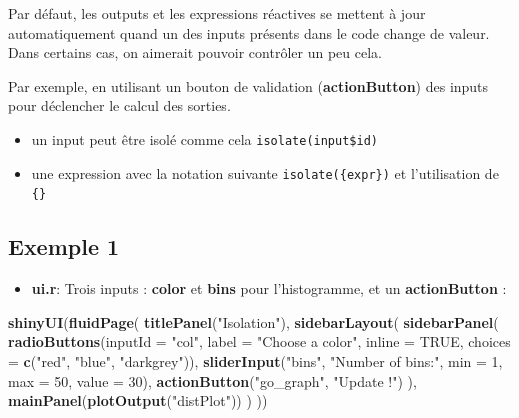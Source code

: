 \documentclass[]{article}
\newenvironment{Shaded}{\begin{snugshade}}{\end{snugshade}}
\newcommand{\KeywordTok}[1]{\textcolor[rgb]{0.13,0.29,0.53}{\textbf{#1}}}
\newcommand{\DataTypeTok}[1]{\textcolor[rgb]{0.13,0.29,0.53}{#1}}
\newcommand{\DecValTok}[1]{\textcolor[rgb]{0.00,0.00,0.81}{#1}}
\newcommand{\StringTok}[1]{\textcolor[rgb]{0.31,0.60,0.02}{#1}}
\newcommand{\OtherTok}[1]{\textcolor[rgb]{0.56,0.35,0.01}{#1}}
\newcommand{\NormalTok}[1]{#1}
\providecommand{\tightlist}{%
  \setlength{\itemsep}{0pt}\setlength{\parskip}{0pt}}
\begin{document}
Par défaut, les outputs et les expressions réactives se mettent à jour
automatiquement quand un des inputs présents dans le code change de
valeur. Dans certains cas, on aimerait pouvoir contrôler un peu cela.

Par exemple, en utilisant un bouton de validation
(\textbf{actionButton}) des inputs pour déclencher le calcul des
sorties.

\begin{itemize}
\item
  un input peut être isolé comme cela \texttt{isolate(input\$id)}
\item
  une expression avec la notation suivante \texttt{isolate(\{expr\})} et
  l'utilisation de \texttt{\{\}}
\end{itemize}

\subsection{Exemple 1}\label{exemple-1}

\begin{itemize}
\tightlist
\item
  \textbf{ui.r}: Trois inputs : \textbf{color} et \textbf{bins} pour
  l'histogramme, et un \textbf{actionButton} :
\end{itemize}

\begin{Shaded}
\begin{Highlighting}[]
\KeywordTok{shinyUI}\NormalTok{(}\KeywordTok{fluidPage}\NormalTok{(}
  \KeywordTok{titlePanel}\NormalTok{(}\StringTok{"Isolation"}\NormalTok{),}
  \KeywordTok{sidebarLayout}\NormalTok{(}
    \KeywordTok{sidebarPanel}\NormalTok{(}
      \KeywordTok{radioButtons}\NormalTok{(}\DataTypeTok{inputId =} \StringTok{"col"}\NormalTok{, }\DataTypeTok{label =} \StringTok{"Choose a color"}\NormalTok{, }\DataTypeTok{inline =} \OtherTok{TRUE}\NormalTok{,}
                   \DataTypeTok{choices =} \KeywordTok{c}\NormalTok{(}\StringTok{"red"}\NormalTok{, }\StringTok{"blue"}\NormalTok{, }\StringTok{"darkgrey"}\NormalTok{)),}
      \KeywordTok{sliderInput}\NormalTok{(}\StringTok{"bins"}\NormalTok{, }\StringTok{"Number of bins:"}\NormalTok{, }\DataTypeTok{min =} \DecValTok{1}\NormalTok{, }\DataTypeTok{max =} \DecValTok{50}\NormalTok{, }\DataTypeTok{value =} \DecValTok{30}\NormalTok{),}
      \KeywordTok{actionButton}\NormalTok{(}\StringTok{"go_graph"}\NormalTok{, }\StringTok{"Update !"}\NormalTok{)}
\NormalTok{    ),}
    \KeywordTok{mainPanel}\NormalTok{(}\KeywordTok{plotOutput}\NormalTok{(}\StringTok{"distPlot"}\NormalTok{))}
\NormalTok{  )}
\NormalTok{))}
\end{Highlighting}
\end{Shaded}
\end{document}
